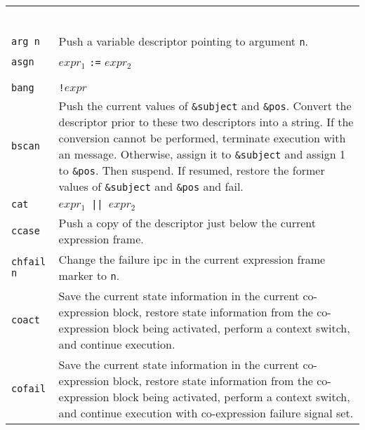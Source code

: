\begin{supertabular}{l@{\hspace{1.5cm}}p{13.5cm}}

\\
\\
\\
\\
\\
\\

\texttt{arg n} & Push a variable descriptor pointing to argument \texttt{n}.\\

\texttt{asgn}  & $expr_1$ \texttt{:=} $expr_2$\\

\\
\\

\texttt{bang}  & \texttt{!$expr$}\\

\texttt{bscan} & Push the current values of \texttt{\&subject} and
\texttt{\&pos}. Convert the descriptor prior to these two descriptors into a
string.  If the conversion cannot be performed, terminate execution with an
message. Otherwise, assign it to \texttt{\&subject} and assign 1 to
\texttt{\&pos}. Then suspend. If resumed, restore the former values of
\texttt{\&subject} and \texttt{\&pos} and fail.\\

\texttt{cat}   & \texttt{$expr_1$ || $expr_2$}\\

\texttt{ccase} & Push a copy of the descriptor just below the current expression frame.\\

\texttt{chfail n} &  Change the failure ipc in the current expression frame
marker to \texttt{n}.\\

\texttt{coact} & Save the current state information in the current co-expression
block, restore state information from the co-expression block being activated,
perform a context switch, and continue execution.\\

\texttt{cofail} & Save the current state information in the current
co-expression block, restore state information from the co-expression
block being activated, perform a context switch, and continue
execution with co-expression failure signal set.\\


\end{supertabular}
